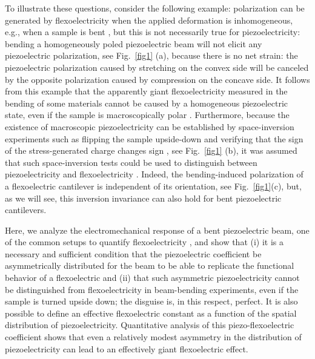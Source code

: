 \documentclass[%
 aps,prl,showpacs,
 amsmath,amssymb,
 reprint,%
]{revtex4-1}
\begin{document}
To illustrate these questions, consider the following example: polarization can be generated by flexoelectricity when the applied deformation is inhomogeneous, e.g., when a sample is bent \cite{ref:Bursian1968,ref:Ma2005,ref:Cross2006,ref:Zubko2007,ref:Majdoub2008B,ref:Kwon2014}, but this is not necessarily true for piezoelectricity: bending a homogeneously poled piezoelectric beam will not elicit any piezoelectric polarization, see Fig.~\ref{fig1} (a), because there is no net strain: the piezoelectric polarization caused by stretching on the convex side will be canceled by
the opposite polarization caused by compression on the concave side. It follows from this example that the apparently giant flexoelectricity measured in the bending of some materials 
cannot be caused by a homogeneous piezoelectric state, even if the sample is macroscopically polar \cite{ref:Biancoli2015}. Furthermore, because the existence of macroscopic piezoelectricity can be established by space-inversion experiments such as flipping the sample upside-down and verifying that the sign of the stress-generated charge changes sign \cite{ref:Biancoli2015}, see Fig.~\ref{fig1} (b), it was assumed that such space-inversion tests could be used to distinguish between piezoelectricity and flexoelectricity \cite{ref:Narvaez2015}. Indeed, the bending-induced polarization of a flexoelectric cantilever is independent of its orientation, see Fig.~\ref{fig1}(c), but, as we will see, this inversion invariance can also hold for bent piezoelectric cantilevers.  

Here, we analyze the electromechanical response of a bent piezoelectric beam, one of the common setups to quantify flexoelectricity \cite{ref:Zubko2013},  
and show that (i) it is a necessary and sufficient condition that the piezoelectric coefficient be asymmetrically distributed for the beam to be able to replicate 
the functional behavior of a flexoelectric and (ii) that such asymmetric piezoelectricity cannot be distinguished from flexoelectricity in beam-bending experiments, even if the sample is turned upside down; the disguise is, in this respect, perfect. 
It is also possible to define an effective flexoelectric constant as a function of the spatial distribution of piezoelectricity. Quantitative analysis of this piezo-flexoelectric coefficient shows that even a relatively modest asymmetry in the distribution of piezoelectricity can lead to an effectively giant flexoelectric effect.
\end{document}
